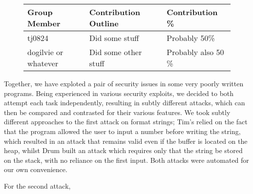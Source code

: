\begin{figure}[h]
\centering
\begin{tabular}{|l|l|l|}
\hline
{\bf Group Member} & {\bf Contribution Outline} & {\bf Contribution \%} \\
\hline
tj0824 & Did some stuff & Probably 50\% \\
dogilvie or whatever & Did some other stuff & Probably also 50 \% \\
\hline
\end{tabular}
\end{figure}

Together, we have exploted a pair of security issues in some very poorly written programs. Being experienced in various security exploits, we decided to both attempt each task independently, resulting in subtly different attacks, which can then be compared and contrasted for their various features. We took subtly different approaches to the first attack on format strings; Tim's relied on the fact that the program allowed the user to input a number before writing the string, which resulted in an attack that remains valid even if the buffer is located on the heap, whilst Drum built an attack which requires only that the string be stored on the stack, with no reliance on the first input. Both attacks were automated for our own convenience.

For the second attack, 